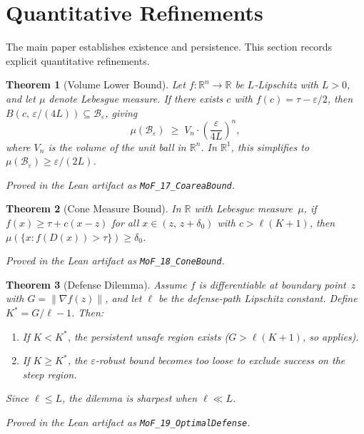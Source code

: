 \documentclass[11pt]{article}
\newtheorem{theorem}{Theorem}[section]
\newcommand{\R}{\mathbb{R}}
\begin{document}
\section{Quantitative Refinements}
\label{app:quantitative}

The main paper establishes existence and persistence. This section
records explicit quantitative refinements.

\begin{theorem}[Volume Lower Bound]
\label{thm:coarea}
Let $f\colon \R^n \to \R$ be $L$-Lipschitz with $L > 0$, and let
$\mu$ denote Lebesgue measure. If there exists $c$ with
$f(c) = \tau - \varepsilon/2$, then
$B(c,\, \varepsilon/(4L)) \subseteq
\mathcal{B}_\varepsilon$, giving
\[
  \mu(\mathcal{B}_\varepsilon)
  \;\geq\; V_n \cdot \left(\frac{\varepsilon}{4L}\right)^{\!n},
\]
where $V_n$ is the volume of the unit ball in $\R^n$. In $\R^1$,
this simplifies to $\mu(\mathcal{B}_\varepsilon) \geq \varepsilon/(2L)$.
\end{theorem}

\noindent\emph{Proved in the Lean artifact as
\textup{\texttt{MoF\_17\_CoareaBound}}.}

\begin{theorem}[Cone Measure Bound]
\label{thm:cone}
In $\R$ with Lebesgue measure~$\mu$, if
$f(x) \geq \tau + c(x - z)$ for all $x \in (z,\, z + \delta_0)$
with $c > \ell(K+1)$, then
$\mu(\{x : f(D(x)) > \tau\}) \geq \delta_0$.
\end{theorem}

\noindent\emph{Proved in the Lean artifact as
\textup{\texttt{MoF\_18\_ConeBound}}.}

\begin{theorem}[Defense Dilemma]
\label{thm:dilemma}
Assume $f$ is differentiable at boundary point~$z$ with
$G = \|\nabla f(z)\|$, and let $\ell$ be the defense-path Lipschitz
constant. Define $K^* = G/\ell - 1$. Then:
\begin{enumerate}[nosep]
  \item If $K < K^*$, the persistent unsafe region exists
    ($G > \ell(K+1)$, so  applies).
  \item If $K \geq K^*$, the $\varepsilon$-robust bound becomes too
    loose to exclude success on the steep region.
\end{enumerate}
Since $\ell \leq L$, the dilemma is sharpest when $\ell \ll L$.
\end{theorem}

\noindent\emph{Proved in the Lean artifact as
\textup{\texttt{MoF\_19\_OptimalDefense}}.}
\end{document}

